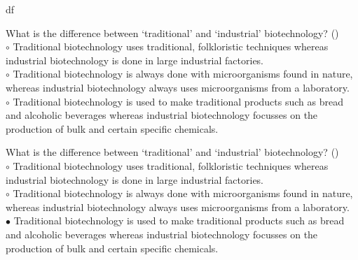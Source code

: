 df\documentclass[]{beamer}
\begin{document}
\begin{CJK}{UTF8}{gbsn}
\begin{frame}[shrink] {}
\addtocounter{questions}{1}
\color{blue}
What is the difference between ‘traditional’ and ‘industrial’ biotechnology?
({})\\
\color{black}
\setlength{\parindent}{-0.4cm}
{\color{red}$\circ$} Traditional biotechnology uses traditional, folkloristic techniques whereas industrial biotechnology is done in large industrial factories.  \\
{\color{red}$\circ$} Traditional biotechnology is always done with microorganisms found in nature, whereas industrial biotechnology always uses microorganisms from a laboratory.  \\
{\color{red}$\circ$}  Traditional biotechnology  is used to make traditional products such as bread and alcoholic beverages whereas industrial biotechnology focusses on the production of bulk and certain specific chemicals.  \\
\end{frame}
\begin{frame}[shrink] {}
\addtocounter{answers}{1}
\color{blue}
What is the difference between ‘traditional’ and ‘industrial’ biotechnology?
({})\\
\color{black}
\setlength{\parindent}{-0.4cm}
{\color{red}$\circ$} Traditional biotechnology uses traditional, folkloristic techniques whereas industrial biotechnology is done in large industrial factories.  \\
{\color{red}$\circ$} Traditional biotechnology is always done with microorganisms found in nature, whereas industrial biotechnology always uses microorganisms from a laboratory.  \\
{\color{red}$\bullet$} Traditional biotechnology  is used to make traditional products such as bread and alcoholic beverages whereas industrial biotechnology focusses on the production of bulk and certain specific chemicals.  \\
\end{frame}



\end{CJK}
\end{document}
